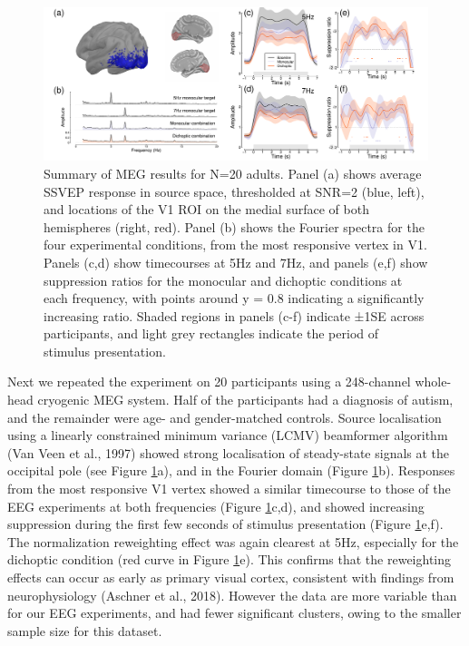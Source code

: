 \documentclass[
]{article}
\begin{document}
\begin{figure}

{\centering \includegraphics{Figures/MEGdata} 

}

\caption{Summary of MEG results for N=20 adults. Panel (a) shows average SSVEP response in source space, thresholded at SNR=2 (blue, left), and locations of the V1 ROI on the medial surface of both hemispheres (right, red). Panel (b) shows the Fourier spectra for the four experimental conditions, from the most responsive vertex in V1. Panels (c,d) show timecourses at 5Hz and 7Hz, and panels (e,f) show suppression ratios for the monocular and dichoptic conditions at each frequency, with points around y = 0.8 indicating a significantly increasing ratio. Shaded regions in panels (c-f) indicate ±1SE across participants, and light grey rectangles indicate the period of stimulus presentation.}\label{fig:MEGdata}
\end{figure}

Next we repeated the experiment on 20 participants using a 248-channel whole-head cryogenic MEG system. Half of the participants had a diagnosis of autism, and the remainder were age- and gender-matched controls. Source localisation using a linearly constrained minimum variance (LCMV) beamformer algorithm (Van Veen et al., 1997) showed strong localisation of steady-state signals at the occipital pole (see Figure \ref{fig:MEGdata}a), and in the Fourier domain (Figure \ref{fig:MEGdata}b). Responses from the most responsive V1 vertex showed a similar timecourse to those of the EEG experiments at both frequencies (Figure \ref{fig:MEGdata}c,d), and showed increasing suppression during the first few seconds of stimulus presentation (Figure \ref{fig:MEGdata}e,f). The normalization reweighting effect was again clearest at 5Hz, especially for the dichoptic condition (red curve in Figure \ref{fig:MEGdata}e). This confirms that the reweighting effects can occur as early as primary visual cortex, consistent with findings from neurophysiology (Aschner et al., 2018). However the data are more variable than for our EEG experiments, and had fewer significant clusters, owing to the smaller sample size for this dataset.
\end{document}
